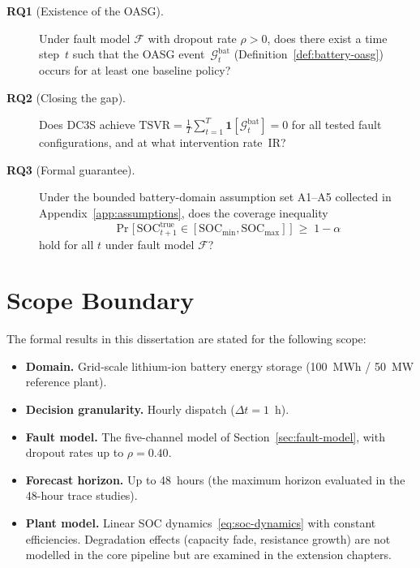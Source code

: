 \begin{description}
  \item[\textbf{RQ1} (Existence of the OASG).]
    Under fault model $\mathcal{F}$ with dropout rate $\rho > 0$, does
    there exist a time step~$t$ such that the OASG
    event~$\mathcal{G}_t^{\mathrm{bat}}$ (Definition~\ref{def:battery-oasg})
    occurs for at least one baseline policy?
  \item[\textbf{RQ2} (Closing the gap).]
    Does DC3S achieve
    $\mathrm{TSVR} = \frac{1}{T}\sum_{t=1}^T
    \mathbf{1}[\mathcal{G}_t^{\mathrm{bat}}] = 0$
    for all tested fault configurations, and at what intervention
    rate~$\mathrm{IR}$?
  \item[\textbf{RQ3} (Formal guarantee).]
    Under the bounded battery-domain assumption set A1--A5 collected in
    Appendix~\ref{app:assumptions}, does the coverage
    inequality
    \[
      \Pr\!\bigl[\,\mathrm{SOC}_{t+1}^{\mathrm{true}}
      \in [\mathrm{SOC}_{\min}, \mathrm{SOC}_{\max}]\,\bigr]
      \;\ge\; 1 - \alpha
    \]
    hold for all $t$ under fault model $\mathcal{F}$?
\end{description}

\section{Scope Boundary}
\label{sec:scope}

The formal results in this dissertation are stated for the following
scope:

\begin{itemize}
  \item \textbf{Domain.}  Grid-scale lithium-ion battery energy storage
    (100~MWh / 50~MW reference plant).
  \item \textbf{Decision granularity.}  Hourly dispatch ($\Delta t = 1$~h).
  \item \textbf{Fault model.}  The five-channel model of
    Section~\ref{sec:fault-model}, with dropout rates up to $\rho = 0.40$.
  \item \textbf{Forecast horizon.}  Up to 48~hours (the maximum horizon
    evaluated in the 48-hour trace studies).
  \item \textbf{Plant model.}  Linear SOC dynamics~\eqref{eq:soc-dynamics}
    with constant efficiencies.  Degradation effects (capacity fade,
    resistance growth) are not modelled in the core pipeline but are
    examined in the extension chapters.
\end{itemize}

